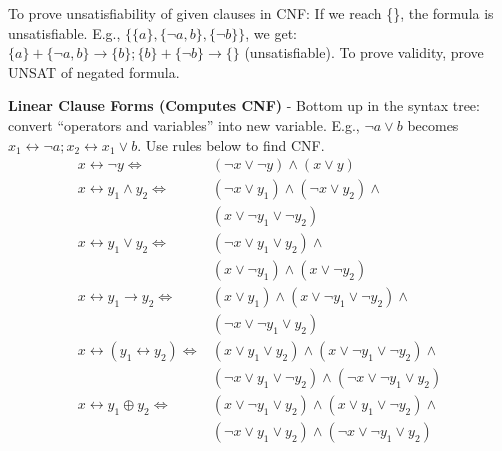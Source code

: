 \documentclass{article}
\begin{document}
\begin{multicols}{4}
To prove unsatisfiability of given clauses in CNF: If we reach \{\}, the formula is unsatisfiable. 
E.g., $\{\{a\}, \{\neg a,b\}, \{\neg b\}\}$, we get: $\{a\} + \{ \neg a,b\} \rightarrow \{b\}; \{b\} + \{\neg b\}\rightarrow\{\} $ (unsatisfiable).
To prove validity, prove UNSAT of negated formula.

\textbf{Linear Clause Forms (Computes CNF)} - Bottom up in the syntax tree: convert “operators and variables” into new variable.
E.g., $\neg a \vee b$ becomes $x_1 \leftrightarrow \neg a; x_2 \leftrightarrow x_1 \vee b$. Use rules below to find CNF.
\begin{align*}
x \leftrightarrow \neg y  \Leftrightarrow &(\neg x \vee \neg y) \wedge (x \vee y) \\
x \leftrightarrow y_1 \wedge y_2 \Leftrightarrow &(\neg x \vee y_1) \wedge (\neg x \vee y_2) \wedge\\
&(x \vee \neg y_1 \vee \neg y_2) \\
x \leftrightarrow y_1 \vee y_2 \Leftrightarrow & (\neg x \vee y_1 \vee y_2) \wedge \\
&( x \vee \neg y_1) \wedge (x \vee \neg y_2) \\
x \leftrightarrow y_1 \rightarrow y_2 \Leftrightarrow & (x \vee y_1) \wedge ( x \vee \neg y_1 \vee \neg y_2) \wedge \\
&(\neg x \vee \neg y_1 \vee y_2) \\
x \leftrightarrow (y_1 \leftrightarrow y_2) \Leftrightarrow & (x \vee y_1 \vee y_2) \wedge (x \vee \neg y_1 \vee \neg y_2) \wedge \\
&(\neg x \vee y_1 \vee \neg y_2) \wedge (\neg x \vee \neg y_1 \vee y_2)\\
x \leftrightarrow y_1 \oplus y_2 \Leftrightarrow & (x \vee \neg y_1 \vee y_2) \wedge (x \vee y_1 \vee \neg y_2) \wedge \\ &(\neg x \vee y_1 \vee y_2) \wedge (\neg x \vee \neg y_1 \vee y_2)
\end{align*}


\end{multicols}
\end{document}
